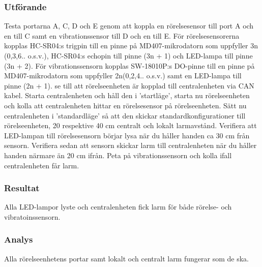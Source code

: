 \subsubsection*{Utförande}
Testa portarna A, C, D och E genom att koppla en rörelsesensor till port A och en till C samt en vibrationssensor till D och en till E. För rörelsesensorerna kopplas HC-SR04:s trigpin till en pinne på MD407-mikrodatorn som uppfyller 3n (0,3,6.. o.s.v.), HC-SR04:s echopin till pinne (3n + 1) och LED-lampa till pinne (3n + 2). 
För vibrationssensorn kopplas SW-18010P:s DO-pinne till en pinne på MD407-mikrodatorn som uppfyller 2n(0,2,4.. o.s.v.) samt en LED-lampa till pinne (2n + 1). 
se till att rörelseenheten är kopplad  till centralenheten via CAN kabel. Starta centralenheten och håll den i 'startläge', starta nu rörelseenheten och kolla att centralenheten hittar en rörelsesensor på rörelseenheten. Sätt nu centralenheten i 'standardläge' så att den skickar standardkonfigurationer till rörelseenheten, 20 respektive 40 cm centralt och lokalt larmavstånd. Verifiera att LED-lampan till rörelsesensorn börjar lysa när du håller handen ca 30 cm från sensorn. Verifiera sedan att sensorn skickar larm till centralenheten när du håller handen närmare än 20 cm ifrån. Peta på vibrationssensorn och kolla ifall centralenheten får larm.

\subsubsection*{Resultat}
Alla LED-lampor lyste och centralenheten fick larm för både rörelse- och vibratoinssensorn.


\subsubsection*{Analys}
Alla rörelseenhetens portar samt lokalt och centralt larm fungerar som de ska.


